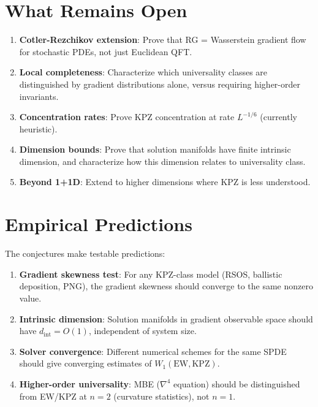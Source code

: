 \documentclass[11pt]{article}
\begin{document}
\section{What Remains Open}

\begin{enumerate}
\item \textbf{Cotler-Rezchikov extension}: Prove that RG = Wasserstein gradient flow for stochastic PDEs, not just Euclidean QFT.

\item \textbf{Local completeness}: Characterize which universality classes are distinguished by gradient distributions alone, versus requiring higher-order invariants.

\item \textbf{Concentration rates}: Prove KPZ concentration at rate $L^{-1/6}$ (currently heuristic).

\item \textbf{Dimension bounds}: Prove that solution manifolds have finite intrinsic dimension, and characterize how this dimension relates to universality class.

\item \textbf{Beyond 1+1D}: Extend to higher dimensions where KPZ is less understood.
\end{enumerate}

\section{Empirical Predictions}

The conjectures make testable predictions:

\begin{enumerate}
\item \textbf{Gradient skewness test}: For any KPZ-class model (RSOS, ballistic deposition, PNG), the gradient skewness should converge to the same nonzero value.

\item \textbf{Intrinsic dimension}: Solution manifolds in gradient observable space should have $d_{\text{int}} = O(1)$, independent of system size.

\item \textbf{Solver convergence}: Different numerical schemes for the same SPDE should give converging estimates of $W_1(\text{EW}, \text{KPZ})$.

\item \textbf{Higher-order universality}: MBE ($\nabla^4$ equation) should be distinguished from EW/KPZ at $n=2$ (curvature statistics), not $n=1$.
\end{enumerate}
\end{document}
